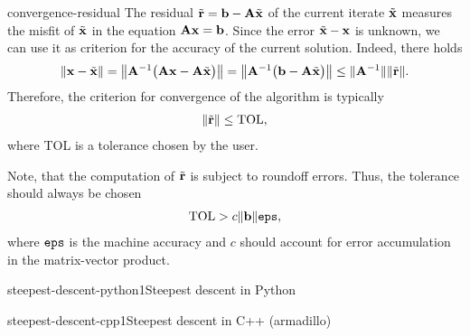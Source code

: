 \begin{Remark}{convergence-residual}
  The residual $\tilde \vr = \vb - \mata\tilde\vx$ of the current iterate
  $\tilde\vx$ measures the misfit of $\tilde\vx$ in the equation
  $\mata\vx = \vb$. Since the error $\tilde\vx-\vx$ is unknown, we can
  use it as criterion for the accuracy of the current
  solution. Indeed, there holds
  \begin{gather}
    \norm{\vx-\tilde\vx}
    = \norm*{\mata^{-1}\bigl(\mata\vx - \mata\tilde\vx\bigr)}
    = \norm*{\mata^{-1}\bigl(\vb - \mata\tilde\vx\bigr)}
    \le \norm{\mata^{-1}}\norm{\tilde \vr}.
  \end{gather}
  Therefore, the criterion for convergence of the algorithm is typically
  \begin{gather}
    \norm{\tilde \vr} \le \text{TOL},
  \end{gather}
  where TOL is a tolerance chosen by the user.

  Note, that the computation of $\tilde \vr$ is subject to roundoff
  errors. Thus, the tolerance should always be chosen
  \begin{gather}
    \text{TOL} > c\norm{\vb}\eps,
  \end{gather}
  where $\eps$ is the machine accuracy and $c$ should account for
  error accumulation in the matrix-vector product.
\end{Remark}

\begin{Algorithm*}{steepest-descent-python1}{Steepest descent in Python}
  
\end{Algorithm*}

\begin{Algorithm*}{steepest-descent-cpp1}{Steepest descent in C++ (armadillo)}
  
\end{Algorithm*}

